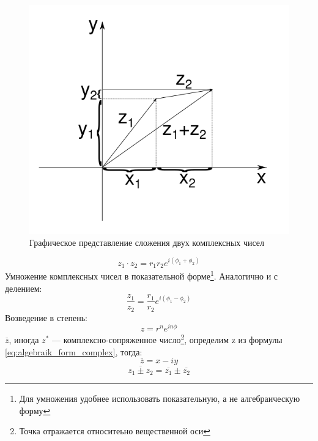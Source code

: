 \documentclass{article}
\begin{document}
            \begin{figure}[h]
                \includegraphics[width=0.8\linewidth]{adding_example}
                \caption{Графическое представление сложения двух комплексных чисел}
                \label{ris:adding_example}
            \end{figure}
            \begin{equation}
               z_{1} \cdot z_{2}=r_{1} r_{2} e^{i (\phi_{1} + \phi_{2})}              
            \end{equation}
            Умножение комплексных чисел в показательной форме\footnote{Для умножения удобнее использовать показательную, а не алгебраическую форму}. Аналогично и с делением:
            \begin{equation}
               \frac{z_{1}}{z_{2}}=\frac{r_{1}}{r_{2}} e^{i (\phi_{1} - \phi_{2})}              
            \end{equation}
          Возведение в степень:
            \begin{equation}
               z=r^{n} e^{i n \phi}              
            \end{equation}
            $ \overline{z} $, иногда $z^{*}$ --- комплексно-сопряженное число\footnote{Точка отражается относитеьно вещественной оси}, определим z из формулы \ref{eq:algebraik_form_complex}, тогда:
            \begin{equation}\label{complex_conjugate}
               \overline{z}=x-i y              
            \end{equation}
            \begin{equation}\label{complex_conjugate}
               \overline{z_{1} \pm z_{2}}=\overline{z_{1}} \pm \overline{z_{2}}              
            \end{equation}
\end{document}
